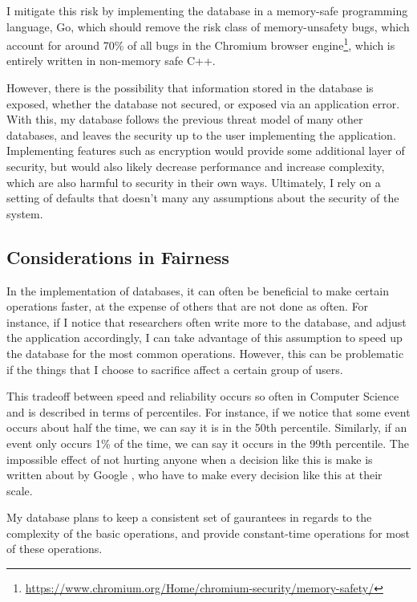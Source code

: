 \documentclass[10pt,twocolumn]{article}
\begin{document}
I mitigate this risk by implementing the database in a memory-safe
programming language, Go, which should remove the risk class of memory-unsafety
bugs, which account for around 70\% of all bugs in the Chromium browser
engine\footnote{\url{https://www.chromium.org/Home/chromium-security/memory-safety/}},
which is entirely written in non-memory safe C++.

However, there is the possibility that information stored in the database is
exposed, whether the database not secured, or exposed via an application error.
With this, my database follows the previous threat model of many other
databases, and leaves the security up to the user implementing the application.
Implementing features such as encryption would provide some additional layer of
security, but would also likely decrease performance and increase complexity,
which are also harmful to security in their own ways. Ultimately, I rely on a
setting of defaults that doesn't many any assumptions about the security of the
system.

\subsection{Considerations in Fairness}

In the implementation of databases, it can often be beneficial to make certain
operations faster, at the expense of others that are not done as often. For
instance, if I notice that researchers often write more to the database, and
adjust the application accordingly, I can take advantage of this assumption to
speed up the database for the most common operations. However, this can be
problematic if the things that I choose to sacrifice affect a certain group of
users.

This tradeoff between speed and reliability occurs so often in Computer Science 
and is described in terms of percentiles. For instance, if we notice that some
event occurs about half the time, we can say it is in the 50th percentile.
Similarly, if an event only occurs 1\% of the time, we can say it occurs in the
99th percentile. The impossible effect of not hurting anyone when a decision
like this is make is written about by Google \cite{dean2013tail}, who have to make every
decision like this at their scale.

My database plans to keep a consistent set of gaurantees in regards to the
complexity of the basic operations, and provide constant-time operations for
most of these operations.
\end{document}
